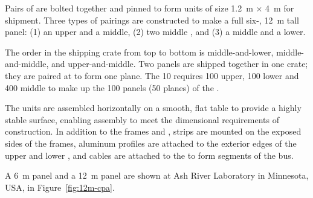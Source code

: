Pairs of  are bolted together and pinned to form  units of size \SI{1.2}{\m} $\times$ \SI{4}{\m} for shipment. Three types of pairings are constructed to make a full six-, \SI{12}{\m} tall  panel: (1) an upper and a middle, (2) two middle , and (3) a middle and a lower.

The order in the shipping crate from top to bottom is middle-and-lower, middle-and-middle, and upper-and-middle.   Two  panels are shipped together in one crate; they are paired at \surf to form one  plane.  The \SI{10}{\kt}  requires 100 upper, 100 lower and 400 middle  to make up the 100  panels (50  planes) of the .

The  units are assembled horizontally on a smooth, flat table to provide a highly stable surface, enabling assembly to meet the dimensional requirements of  construction.  
In addition to the frames and , 
 strips are mounted on the exposed sides of the \frfour frames, aluminum profiles are attached to the exterior edges of the upper and lower , 
and cables are attached to the  to form segments of the  bus.  


A \SI{6}{\m}   panel and a \SI{12}{\m}   panel are shown at Ash River Laboratory in Minnesota, USA,  in Figure~\ref{fig:12m-cpa}.


